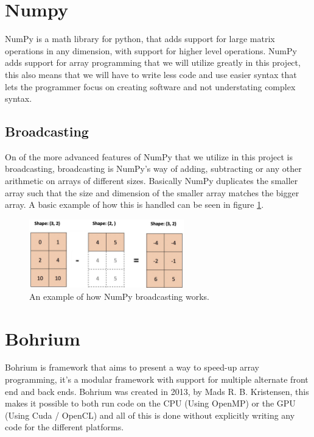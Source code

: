 \documentclass[12pt]{report}
\begin{document}
\section{Numpy}
\label{sec:numpy}
NumPy is a math library for python, that adds support for large matrix operations in any dimension, with support for higher level operations. NumPy adds support for array programming that we will utilize greatly in this project, this also means that we will have to write less code and use easier syntax that lets the programmer focus on creating software and not understating complex syntax.
\subsection{Broadcasting}
\label{subsec:Broadcasting}

On of the more advanced features of NumPy that we utilize in this project is broadcasting, broadcasting is NumPy's way of adding, subtracting or any other arithmetic on arrays of different sizes. Basically NumPy duplicates the smaller array such that the size and dimension of the smaller array matches the bigger array. A basic example of how this is handled can be seen in figure \ref{fig:broadcasting}.

\begin{figure}[H]
  \centering
  \includegraphics[width = 0.6\textwidth]{images/broadcasting.png}
  \caption{An example of how NumPy broadcasting works.\label{fig:broadcasting}}
\end{figure}





\section{Bohrium}
\label{subsec:Bohrium}
Bohrium is framework that aims to present a way to speed-up array programming, it's a modular framework with support for multiple alternate front end and back ends. Bohrium was created in 2013, by Mads R. B. Kristensen, this makes it possible to both run code on the CPU (Using OpenMP) or the GPU (Using Cuda / OpenCL) and all of this is done without explicitly writing any code for the different platforms.
\end{document}
